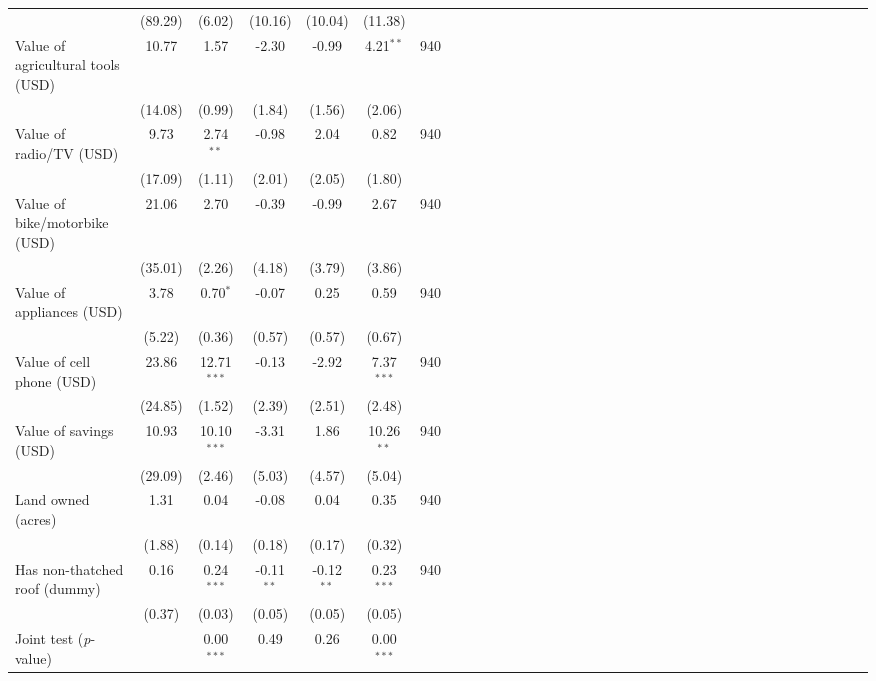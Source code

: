 {\begin{tabular}{l*{6}{SSSSSc}}
          &  (89.29)&   (6.02)&  (10.16)&  (10.04)&  (11.38)&         \\
\hspace{0.2cm}Value of agricultural tools (USD)&    10.77&     1.57&    -2.30&    -0.99&4.21$^{**}$&      940\\
          &  (14.08)&   (0.99)&   (1.84)&   (1.56)&   (2.06)&         \\
\hspace{0.2cm}Value of radio/TV (USD)&     9.73&2.74$^{**}$&    -0.98&     2.04&     0.82&      940\\
          &  (17.09)&   (1.11)&   (2.01)&   (2.05)&   (1.80)&         \\
\hspace{0.2cm}Value of bike/motorbike (USD)&    21.06&     2.70&    -0.39&    -0.99&     2.67&      940\\
          &  (35.01)&   (2.26)&   (4.18)&   (3.79)&   (3.86)&         \\
\hspace{0.2cm}Value of appliances (USD)&     3.78&0.70$^{*}$&    -0.07&     0.25&     0.59&      940\\
          &   (5.22)&   (0.36)&   (0.57)&   (0.57)&   (0.67)&         \\
\hspace{0.2cm}Value of cell phone (USD)&    23.86&12.71$^{***}$&    -0.13&    -2.92&7.37$^{***}$&      940\\
          &  (24.85)&   (1.52)&   (2.39)&   (2.51)&   (2.48)&         \\
Value of savings (USD)&    10.93&10.10$^{***}$&    -3.31&     1.86&10.26$^{**}$&      940\\
          &  (29.09)&   (2.46)&   (5.03)&   (4.57)&   (5.04)&         \\
Land owned (acres)&     1.31&     0.04&    -0.08&     0.04&     0.35&      940\\
          &   (1.88)&   (0.14)&   (0.18)&   (0.17)&   (0.32)&         \\
Has non-thatched roof (dummy)&     0.16&0.24$^{***}$&-0.11$^{**}$&-0.12$^{**}$&0.23$^{***}$&      940\\
          &   (0.37)&   (0.03)&   (0.05)&   (0.05)&   (0.05)&         \\
\midrule Joint test (\emph{p}-value)&         &0.00$^{***}$&     0.49&     0.26&0.00$^{***}$&         \\
\bottomrule
\end{tabular}
}
